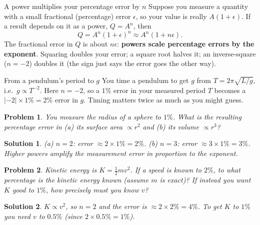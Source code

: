 \documentclass[11pt]{article}
\newcommand{\clearpts}{\addtocounter{tpts}{\value{cpts}} \setcounter{cpts}{0}}
\newcommand{\pts}[1]{\clearpts \setcounter{cpts}{#1}}
\newtheorem*{solution}{Solution}
\theoremstyle{mystyle}
\newtheorem{pproblem}{Problem}
\begin{document}
\begin{psidea}{A power multiplies your percentage error by $n$}{}
Suppose you measure a quantity with a small fractional (percentage) error $\epsilon$, so
your value is really $A(1+\epsilon)$. If a result depends on it as a power, $Q = A^n$, then
\[
Q = A^n(1+\epsilon)^n \approx A^n(1 + n\epsilon).
\]
The fractional error in $Q$ is about $n\epsilon$: \textbf{powers scale percentage errors
by the exponent}. Squaring doubles your error; a square root halves it; an inverse-square
($n = -2$) doubles it (the sign just says the error goes the other way).
\end{psidea}

\begin{psexample}{From a pendulum's period to $g$}{}
You time a pendulum to get $g$ from $T = 2\pi\sqrt{L/g}$, i.e.\ $g \propto T^{-2}$. Here
$n = -2$, so a $1\%$ error in your measured period $T$ becomes a
$|{-2}|\times 1\% = 2\%$ error in $g$. Timing matters twice as much as you might guess.
\end{psexample}

\pts{3}
\begin{pproblem}
You measure the radius of a sphere to $1\%$. What is the resulting percentage error in
(a) its surface area $\propto r^2$ and (b) its volume $\propto r^3$?
\end{pproblem}
\begin{solution}
(a) $n = 2$: error $\approx 2 \times 1\% = 2\%$.\quad
(b) $n = 3$: error $\approx 3 \times 1\% = 3\%$. Higher powers amplify the measurement
error in proportion to the exponent.
\end{solution}

\pts{3}
\begin{pproblem}
Kinetic energy is $K = \tfrac12 m v^2$. If a speed is known to $2\%$, to what percentage
is the kinetic energy known (assume $m$ is exact)? If instead you want $K$ good to $1\%$,
how precisely must you know $v$?
\end{pproblem}
\begin{solution}
$K \propto v^2$, so $n = 2$ and the error is $\approx 2 \times 2\% = 4\%$. To get $K$ to
$1\%$ you need $v$ to $0.5\%$ (since $2\times 0.5\% = 1\%$).
\end{solution}
\end{document}
